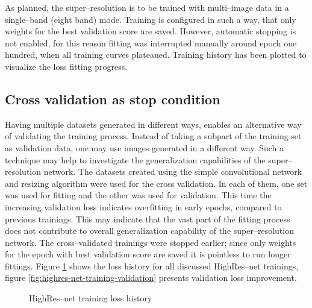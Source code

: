 As planned, the super--resolution is to be trained with multi--image data in a single--band (eight band) mode.
Training is configured in such a way, that only weights for the best validation score are saved.
However, automatic stopping is not enabled, for this reason fitting was interrupted manually around epoch one hundred, when all training curves plateaued.
Training history has been plotted to visualize the loss fitting progress.

\subsection{Cross validation as stop condition}
Having multiple datasets generated in different ways, enables an alternative way of validating the training process.
Instead of taking a subpart of the training set as validation data, one may use images generated in a different way.
Such a technique may help to investigate the generalization capabilities of the super--resolution network.
The datasets created using the simple convolutional network and resizing algorithm were used for the cross validation.
In each of them, one set was used for fitting and the other was used for validation.
This time the increasing validation loss indicates overfitting in early epochs, compared to previous trainings.
This may indicate that the vast part of the fitting process does not contribute to overall generalization capability of the super--resolution network.
The cross--validated trainings were stopped earlier; since only weights for the epoch with best validation score are saved it is pointless to run longer fittings.
Figure \ref{fig:highres-net-training-loss} shows the loss history for all discussed HighRes--net trainings, figure \ref{fig:highres-net-training-validation} presents validation loss improvement.
\begin{figure}
    \centering
    \caption{HighRes--net training loss history}
    \label{fig:highres-net-training-loss}
\end{figure}
